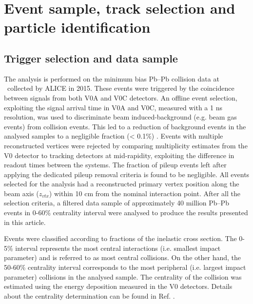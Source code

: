 \newpage
\section{Event sample, track selection and particle identification}
\label{Sec:EventTrackIdentification}
\subsection{Trigger selection and data sample}
\label{SubSec:Event}
The analysis is performed on the minimum bias Pb--Pb collision data at \sNN~collected by ALICE in 2015. These events were triggered by the coincidence between signals from both V0A and V0C detectors. An offline event selection, exploiting the signal arrival time in V0A and V0C, measured with a 1 ns resolution, was used to discriminate beam induced-background (e.g. beam gas events) from collision events. This led to a reduction of background events in the analysed samples to a negligible fraction (< 0.1\%) \cite{Abelev:2014ffa}. Events with multiple reconstructed vertices were rejected by comparing multiplicity estimates from the V0 detector to tracking detectors at mid-rapidity, exploiting the difference in readout times between the systems. The fraction of pileup events left after applying the dedicated pileup removal criteria is found to be negligible. All events selected for the analysis had a reconstructed primary vertex position along the beam axis ($z_{vtx}$) within 10 cm from the nominal interaction point. After all the selection criteria, a filtered data sample of approximately 40 million Pb--Pb events in 0-60\% centrality interval were analysed to produce the results presented in this article.

Events were classified according to fractions of the inelastic cross section. The 0-5\% interval represents the most central interactions (i.e. smallest impact parameter) and is referred to as most central collisions. On the other hand, the 50-60\% centrality interval corresponds to the most peripheral (i.e. largest impact parameter) collisions in the analysed sample. The centrality of the collision was estimated using the energy deposition measured in the V0 detectors. Details about the centrality determination can be found in Ref. \cite{Abelev:2013qoq}.

